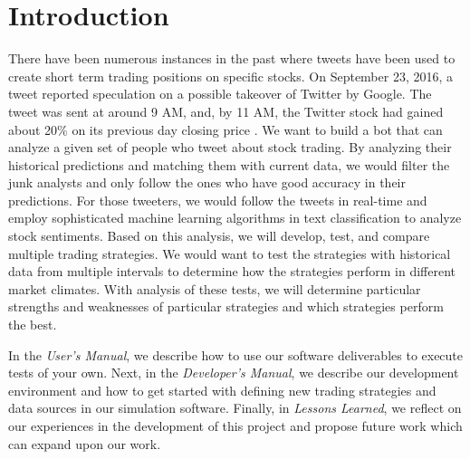 \section{Introduction}

There have been numerous instances in the past where tweets have been used to create short term trading positions on specific stocks.
On September 23, 2016, a tweet reported speculation on a possible takeover of Twitter by Google.
The tweet was sent at around 9 AM, and, by 11 AM, the Twitter stock had gained about 20\% on its previous day closing price \cite{twitterTakeover}.
We want to build a bot that can analyze a given set of people who tweet about stock trading.
By analyzing their historical predictions and matching them with current data, we would filter the junk analysts and only follow the ones who have good accuracy in their predictions.
For those tweeters, we would follow the tweets in real-time and employ sophisticated machine learning algorithms in text classification to analyze stock sentiments.
Based on this analysis, we will develop, test, and compare multiple trading strategies.
We would want to test the strategies with historical data from multiple intervals to determine how the strategies perform in different market climates.
With analysis of these tests, we will determine particular strengths and weaknesses of particular strategies and which strategies perform the best.

In the \textit{User's Manual}, we describe how to use our software deliverables to execute tests of your own.
Next, in the \textit{Developer's Manual}, we describe our development environment and how to get started with defining new trading strategies and data sources in our simulation software.
Finally, in \textit{Lessons Learned}, we reflect on our experiences in the development of this project and propose future work which can expand upon our work.

